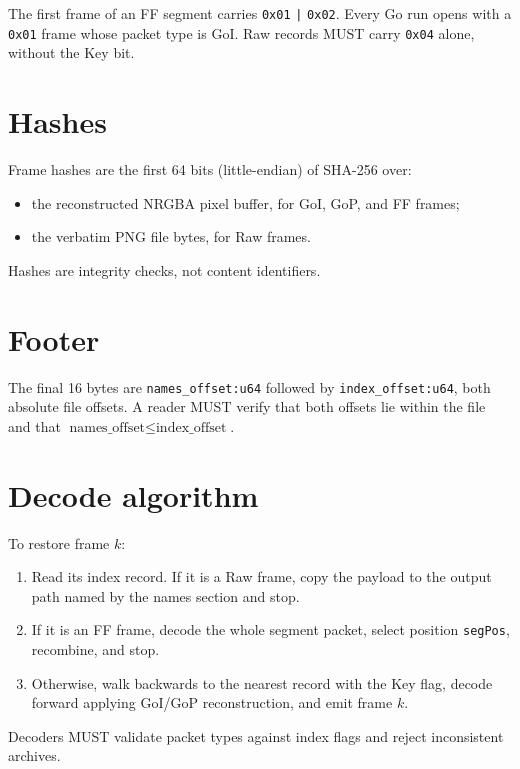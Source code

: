 \documentclass[11pt,a4paper]{article}
\begin{document}
The first frame of an FF segment carries \texttt{0x01} \texttt{|} \texttt{0x02}.
Every Go run opens with a \texttt{0x01} frame whose packet type is GoI. Raw
records MUST carry \texttt{0x04} alone, without the Key bit.

\section{Hashes}
\label{sec:hashes}

Frame hashes are the first 64 bits (little-endian) of SHA-256 over:

\begin{itemize}
\item the reconstructed NRGBA pixel buffer, for GoI, GoP, and FF frames;
\item the verbatim PNG file bytes, for Raw frames.
\end{itemize}

Hashes are integrity checks, not content identifiers.

\section{Footer}
\label{sec:footer}

The final 16 bytes are \texttt{names\_offset:u64} followed by
\texttt{index\_offset:u64}, both absolute file offsets. A reader MUST verify
that both offsets lie within the file and that
$\text{names\_offset} \le \text{index\_offset}$.

\section{Decode algorithm}

To restore frame $k$:

\begin{enumerate}
\item Read its index record. If it is a Raw frame, copy the payload to the
output path named by the names section and stop.
\item If it is an FF frame, decode the whole segment packet, select position
\texttt{segPos}, recombine, and stop.
\item Otherwise, walk backwards to the nearest record with the Key flag,
decode forward applying GoI/GoP reconstruction, and emit frame $k$.
\end{enumerate}

Decoders MUST validate packet types against index flags and reject
inconsistent archives.
\end{document}
